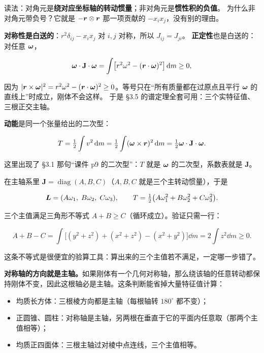 \documentclass[11pt]{ctexart}
\newcommand{\ten}[1]{\mathbf{#1}}
\let\origsubhdr\subhdr
\renewcommand{\subhdr}[1]{\par\needspace{3\baselineskip}\origsubhdr{#1}}
\begin{document}
读法：对角元是\textbf{绕对应坐标轴的转动惯量}；非对角元是\textbf{惯性积的负值}。
为什么非对角元带负号？它就是 $-\boldsymbol{r}\otimes\boldsymbol{r}$ 那一项贡献的 $-x_ix_j$，没有别的理由。

\textbf{对称性是白送的}：$r^2\delta_{ij}-x_ix_j$ 对 $i,j$ 对称，所以 $J_{ij}=J_{ji}$。
\textbf{正定性}也是白送的：对任意 $\boldsymbol{\omega}$，

\[
\vect\omega\cdot\ten J\cdot\vect\omega=\int\bigl[r^2\omega^2-(\vect r\cdot\vect\omega)^2\bigr]\dd m\ge0,
\]

因为 $|\boldsymbol{r}\times\boldsymbol{\omega}|^2=r^2\omega^2-(\boldsymbol{r}\cdot\boldsymbol{\omega})^2\ge0$。等号只在“所有质量都在过原点且平行 $\boldsymbol{\omega}$ 的直线上”时成立，刚体不会这样。
于是 §3.5 的谱定理全套可用：三个实特征值、三根正交主轴。

\textbf{动能}是同一个张量给出的二次型：

\[
T=\tfrac12\int v^2\dd m=\tfrac12\int(\vect\omega\times\vect r)^2\dd m=\tfrac12\vect\omega\cdot\ten J\cdot\vect\omega .
\]

这里出现了 §3.1 那句“课件 p9 的二次型”：$T$ 就是 $\boldsymbol{\omega}$ 的二次型，系数表就是 $\ten J$。


在主轴系里 $\ten J=\operatorname{diag}(A,B,C)$（$A,B,C$ 就是三个主转动惯量），于是

\[
\boldsymbol{L}=(A\omega_1,\;B\omega_2,\;C\omega_3),
\qquad
T=\tfrac12\bigl(A\omega_1^2+B\omega_2^2+C\omega_3^2\bigr).
\]

三个主值满足三角形不等式 $A+B\ge C$（循环成立）。验证只需一行：

\[
A+B-C=\int\bigl[(y^2+z^2)+(x^2+z^2)-(x^2+y^2)\bigr]\dd m=2\int z^2\dd m\ge0 .
\]

这条不等式是很便宜的验算工具：算出来的三个主值若不满足，一定哪一步错了。

\textbf{对称轴的方向就是主轴。}如果刚体有一个几何对称轴，那么绕该轴的任意转动都保持刚体不变，因此这根轴必是主轴。这条判断能省掉大量特征值计算：

\begin{itemize}
\item 均质长方体：三根棱方向都是主轴（每根轴转 $180^\circ$ 都不变）；
\item 正圆锥、圆柱：对称轴是主轴，另两根在垂直于它的平面内任意取（那两个主值相等）；
\item 均质正四面体：三根主轴过对棱中点连线，三个主值相等。
\end{itemize}

\end{document}
